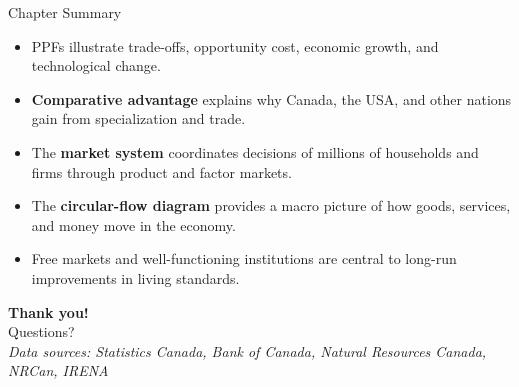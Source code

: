 \documentclass[aspectratio=169]{beamer}
\begin{document}
\begin{frame}{Chapter Summary}
\transfade
\begin{itemize}[<+->]
  \item PPFs illustrate trade-offs, opportunity cost, economic growth, and technological change.
  \item \textbf{Comparative advantage} explains why Canada, the USA, and other nations gain from specialization and trade.
  \item The \textbf{market system} coordinates decisions of millions of households and firms through product and factor markets.
  \item The \textbf{circular-flow diagram} provides a macro picture of how goods, services, and money move in the economy.
  \item Free markets and well-functioning institutions are central to long-run improvements in living standards.
\end{itemize}
\end{frame}

\begin{frame}
\centering
\Huge \textbf{Thank you!}\\[1em]
\normalsize Questions? \\[0.5em]
\small \textit{Data sources: Statistics Canada, Bank of Canada, Natural Resources Canada, NRCan, IRENA}
\end{frame}
\end{document}
